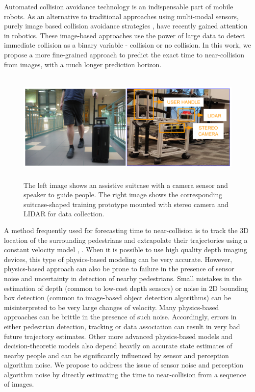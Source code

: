 
Automated collision avoidance technology is an indispensable part of mobile robots. As an alternative to traditional approaches using multi-modal sensors, purely image based collision avoidance strategies \cite{gandhi}, \cite{DroNet} have recently gained attention in robotics. These image-based approaches use the power of large data to detect immediate collision as a binary variable - collision or no collision. In this work, we propose a more fine-grained approach to predict the exact time to near-collision from images, with a much longer prediction horizon.  

   \begin{figure}[t]
      \centering
      \includegraphics[height=5.5cm, width=\columnwidth]{figs/aspect_ratio_setup.pdf}
      \caption{The left image shows an assistive suitcase with a camera sensor and speaker to guide people. The right image shows the corresponding suitcase-shaped training prototype mounted with stereo camera and LIDAR for data collection.}
      \label{fig:setup}
   \end{figure}

A method frequently used for forecasting time to near-collision is to track the 3D location of the surrounding pedestrians and extrapolate their trajectories using a constant velocity model \cite{SIPP}, \cite{BBeep}. When it is possible to use high quality depth imaging devices, this type of physics-based modeling can be very accurate. However, physics-based approach can also be prone to failure in the presence of sensor noise and uncertainty in detection of nearby pedestrians. Small mistakes in the estimation of depth (common to low-cost depth sensors) or noise in 2D bounding box detection (common to image-based object detection algorithms) can be misinterpreted to be very large changes of velocity. Many physics-based approaches can be brittle in the presence of such noise. Accordingly, errors in either pedestrian detection, tracking or data association can result in very bad future trajectory estimates. Other more advanced physics-based models and decision-theoretic models also depend heavily on accurate state estimates of nearby people and can be significantly influenced by sensor and perception algorithm noise. We propose to address the issue of sensor noise and perception algorithm noise by directly estimating the time to near-collision from a sequence of images.
   
